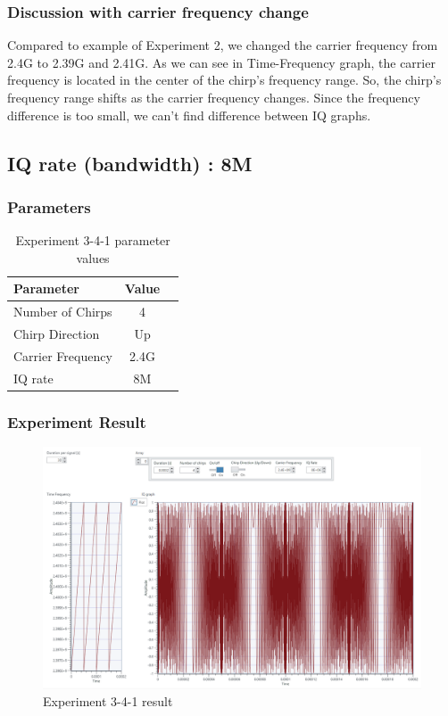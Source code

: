     \subsubsection*{Discussion with carrier frequency change}
    Compared to example of Experiment 2, we changed the carrier frequency from 2.4G to 2.39G and 2.41G. As we can see in Time-Frequency graph, the carrier frequency is located in the center of the chirp’s frequency range. So, the chirp’s frequency range shifts as the carrier frequency changes. Since the frequency difference is too small, we can’t find difference between IQ graphs. \\
\clearpage
\subsection{IQ rate (bandwidth) : 8M}
    \subsubsection*{Parameters}
    \begin{table}[!h]\centering
        \hspace{10mm}
        \begin{tabular}{|l|c|c|}
        \hline
        \multicolumn{1}{|l|}{Parameter} & \multicolumn{1}{l|}{Value} \\
        \hline
        Number of Chirps & 4 \\ 
        \hline
        Chirp Direction & Up \\ 
        \hline
        Carrier Frequency & 2.4G \\ 
        \hline
        IQ rate & 8M \\ 
        \hline
        \end{tabular}
        \caption{Experiment 3-4-1 parameter values}
    \end{table}
    \subsubsection*{Experiment Result}
    \vspace{-4mm}  
    \begin{figure}[!h]\raggedleft
    \hspace{15mm}
		\includegraphics[width=.95\textwidth]{image/week03/3-4-1.png}
		\caption{\footnotesize Experiment 3-4-1 result}
		\vspace{-10pt}
    \end{figure}
